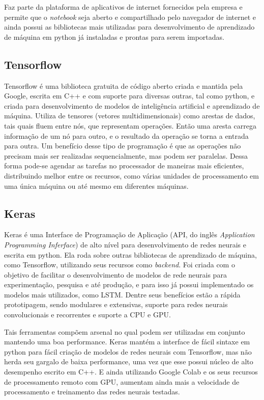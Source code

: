 \documentclass[
	12pt,				%
	oneside,			%
	a4paper,			%
	english,			%
	brazil				%
	]{abntex2}
\begin{document}
Faz parte da plataforma de aplicativos de internet fornecidos pela empresa e permite que o \textit{notebook} seja aberto e compartilhado pelo navegador de internet e ainda possui as bibliotecas mais utilizadas para desenvolvimento de aprendizado de máquina em python já instaladas e prontas para serem importadas. 

\subsection{Tensorflow}
Tensorflow é uma biblioteca gratuita de código aberto criada e mantida pela Google, escrita em C++ e com suporte para diversas outras, tal como python, e criada para desenvolvimento de modelos de inteligência artificial e aprendizado de máquina. Utiliza de tensores (vetores multidimensionais) como arestas de dados, tais quais fluem entre nós, que representam operações. Então uma aresta carrega informação de um nó para outro, e o resultado da operação se torna a entrada para outra. Um benefício desse tipo de programação é que as operações não precisam mais ser realizadas sequencialmente, mas podem ser paralelas. Dessa forma pode-se agendar as tarefas no processador de maneiras mais eficientes, distribuindo  melhor entre os recursos, como várias unidades de processamento em uma única máquina ou até mesmo em diferentes máquinas. 

\subsection{Keras}
Keras é uma Interface de Programação de Aplicação (API, do inglês \textit{Application Programming Inferface}) de alto nível para desenvolvimento de redes neurais e escrita em python. Ela roda sobre outras bibliotecas de aprendizado de máquina, como Tensorflow, utilizando seus recursos como \textit{backend}. Foi criada com o objetivo de facilitar o desenvolvimento de modelos de rede neurais para experimentação, pesquisa e até produção, e para isso já possui implementado os modelos mais utilizados, como LSTM. Dentre seus benefícios estão a rápida prototipagem, sendo modulares e extensivas, suporte para redes neurais convolucionais e recorrentes e suporte a CPU e GPU.


Tais ferramentas compõem arsenal no qual podem ser utilizadas em conjunto mantendo uma boa performance. Keras mantém a interface de fácil sintaxe em python para fácil criação de modelos de redes neurais com Tensorflow, mas não herda seu gargalo de baixa performance, uma vez que esse possui núcleo de alto desempenho escrito em C++. E ainda utilizando Google Colab e os seus recursos de processamento remoto com GPU, aumentam ainda mais a velocidade de processamento e treinamento das redes neurais testadas. 
\end{document}
